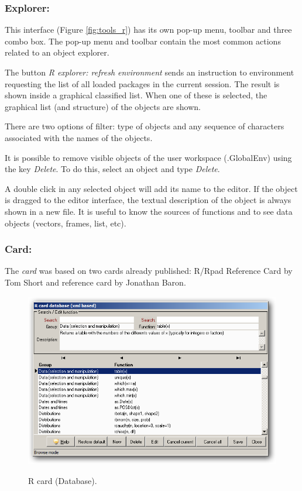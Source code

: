 \newpage
\subsubsection{Explorer:}

This interface
(Figure \ref{fig:tools_r})
has its own pop-up menu, toolbar and three combo box. The
pop-up menu and toolbar contain the most common actions related to an object
explorer.

The button \textit{R explorer: refresh environment} sends an instruction to
\RR{} environment requesting the list of all loaded packages in the current
session. The result is shown inside a graphical classified list. When one
of these is selected, the graphical list (and structure) of the objects
are shown.

There are two options of filter: type of objects and any sequence of
characters associated with the names of the objects.

It is possible to remove visible objects of the user workspace (.GlobalEnv)
using the key \textit{Delete}. To do this, select an object and type
\textit{Delete}.

A double click in any selected object will add its name to the editor.
If the object is dragged to the editor interface, the textual description
of the object is always shown in a new file. It is useful to know the
sources of functions and to see data objects (vectors, frames, list, etc).

\subsubsection{Card:}

The \textit{card} was based on two \RR{} cards already published:
R/Rpad Reference Card by Tom Short and \RR{} reference card by Jonathan Baron.

\begin{figure}[h!]
  \includegraphics[scale=0.35]{./res/rcard_dlg.png}\\
  \caption{R card (Database).}
  \label{fig:rcard_dlg_2}
\end{figure}

